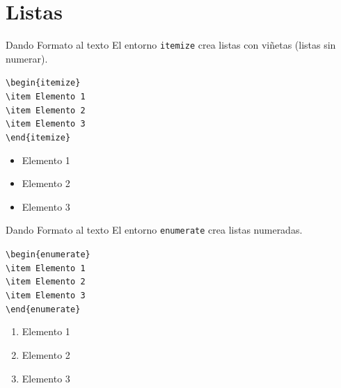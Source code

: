 \documentclass[12pt]{beamer}
\begin{document}
\section{Listas}
\begin{frame}{Dando Formato al texto}
  El entorno {\color{blue}\texttt{itemize}} crea listas con viñetas (listas sin numerar).
  \begin{center}
    \begin{minipage}{0.5\textwidth} 
  \begin{block}{}
    \texttt{\textbackslash begin\{itemize\}\\
      \textbackslash item Elemento 1\\
      \textbackslash item Elemento 2\\
      \textbackslash item Elemento 3\\
    \textbackslash end\{itemize\}}
  \end{block}
  \end{minipage}
  \end{center}
  \begin{itemize}
    \item Elemento 1
    \item Elemento 2
    \item Elemento 3
  \end{itemize}
\end{frame}
\begin{frame}{Dando Formato al texto}
  El entorno {\color{blue}\texttt{enumerate}} crea listas numeradas.
  \begin{center}
    \begin{minipage}{0.5\textwidth} 
  \begin{block}{}
    \texttt{\textbackslash begin\{enumerate\}\\
      \textbackslash item Elemento 1\\
      \textbackslash item Elemento 2\\
      \textbackslash item Elemento 3\\
    \textbackslash end\{enumerate\}}
  \end{block}
  \end{minipage}
  \end{center}
  \begin{enumerate}
    \item Elemento 1
    \item Elemento 2
    \item Elemento 3
  \end{enumerate}
\end{frame}
\end{document}
